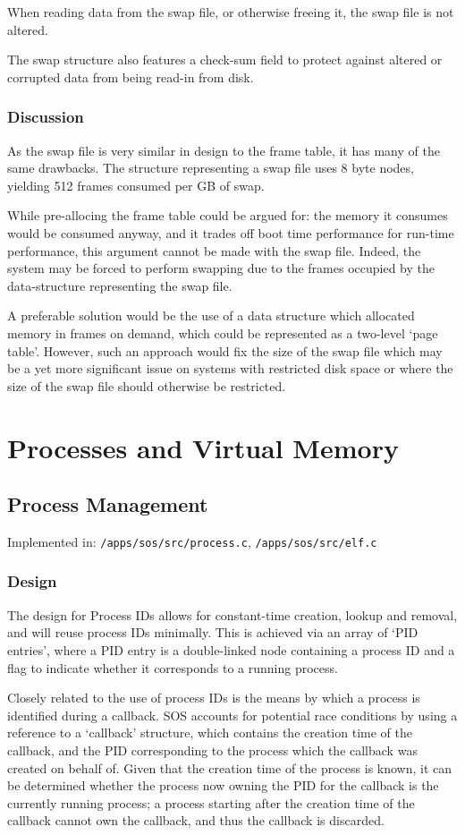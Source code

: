 \documentclass[a4paper,12pt]{article}
\begin{document}
When reading data from the swap file, or otherwise freeing it, the swap file
is not altered.

The swap structure also features a check-sum field to protect against altered
or corrupted data from being read-in from disk.

\subsubsection{Discussion}
As the swap file is very similar in design to the frame table, it has many of
the same drawbacks.  The structure representing a swap file uses 8 byte nodes,
yielding 512 frames consumed per GB of swap.

While pre-allocing the frame table could be argued for: the memory it consumes
would be consumed anyway, and it trades off boot time performance for run-time
performance, this argument cannot be made with the swap file.  Indeed, the
system may be forced to perform swapping due to the frames occupied by the
data-structure representing the swap file.

A preferable solution would be the use of a data structure which allocated
memory in frames on demand, which could be represented as a two-level `page
table'.  However, such an approach would fix the size of the swap file which
may be a yet more significant issue on systems with restricted disk space or
where the size of the swap file should otherwise be restricted.

\section{Processes and Virtual Memory}
\subsection{Process Management}
Implemented in: \texttt{/apps/sos/src/process.c}, \texttt{/apps/sos/src/elf.c}

\subsubsection{Design}
The design for Process IDs allows for constant-time creation, lookup and
removal, and will reuse process IDs minimally.  This is achieved via an array
of `PID entries', where a PID entry is a double-linked node containing a
process ID and a flag to indicate whether it corresponds to a running process.

Closely related to the use of process IDs is the means by which a process is
identified during a callback.  SOS accounts for potential race conditions by
using a reference to a `callback' structure, which contains the creation time
of the callback, and the PID corresponding to the process which the callback
was created on behalf of.  Given that the creation time of the process is
known, it can be determined whether the process now owning the PID for the
callback is the currently running process; a process starting after the
creation time of the callback cannot own the callback, and thus the callback
is discarded.
\end{document}
